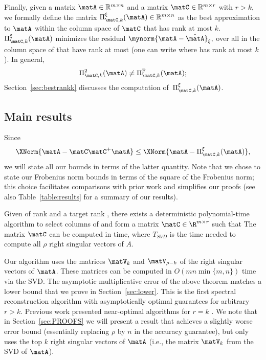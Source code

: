 Finally, given a matrix $\matA \in \mathbb{R}^{m \times n}$ and a matrix $\matC \in \mathbb{R}^{m \times r}$ with $r > k$, we formally define the matrix $\Pi_{\matC,k}^{\xi}(\matA)\in \mathbb{R}^{m \times n}$ as the best approximation to $\matA$ within the column space of $\matC$ that has rank at most
$k$.  $\Pi_{\matC,k}^{\xi}(\matA)$
minimizes the residual
$\mynorm{\matA-\hat\matA}_\xi,$
over all
\math{\hat\matA} in the column space of
\math{\matC} that have rank at most  (one can write
 where
 has rank at most $k$).
In general, $$\Pi_{\matC,k}^{2}(\matA) \neq \Pi_{\matC,k}^{\mathrm{F}}(\matA);$$ Section~\ref{sec:bestrankk} discusses the computation of~$\Pi_{\matC,k}^{\xi}(\matA)$.





\subsection{Main results}\label{sec:main0}

Since
$$\XNorm{\matA-\matC\matC^+\matA} \le \XNorm{\matA-\Pi^{\xi}_{\matC,k}(\matA)},$$
we will state all our bounds in terms of the latter quantity. Note that we chose to state our Frobenius norm bounds in terms of the square of the Frobenius norm; this choice facilitates comparisons with prior work and simplifies our proofs (see also Table~\ref{table:results} for a summary of our results).
\begin{theorem}
\label{theorem:intro1}
Given  of rank \math{\rho}
and a target rank ,
there exists a deterministic polynomial-time algorithm to
select  columns of \math{\matA} and form a matrix
$\matC\in\R^{m \times r}$ such that
The matrix $\matC$ can be computed in
 time, where $T_{SVD}$ is the time needed to compute all $\rho$ right singular vectors of $A$.
\end{theorem}


Our algorithm uses
 the matrices $\matV_k$ and $\matV_{\rho-k}$ of the right singular vectors of $\matA$. These matrices can be computed in $O(mn \min\{m,n\})$ time via the SVD. The asymptotic multiplicative error of the above theorem matches a lower bound that we prove in Section~\ref{sec:lower}. This is the first spectral reconstruction algorithm with asymptotically optimal guarantees for arbitrary $r > k$. Previous work presented near-optimal algorithms for $r=k$ \cite{GE96}. We note that in Section~\ref{sec:PROOFS} we will present a result that achieves a slightly worse error bound (essentially replacing $\rho$ by $n$ in the accuracy guarantee), but only uses the top $k$ right singular vectors of $\matA$ (i.e., the matrix $\matV_k$ from the SVD of $\matA$).

